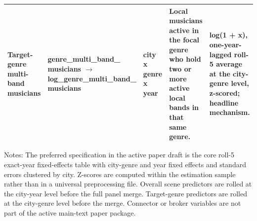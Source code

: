 \begin{table}[p]
\begin{tabularx}{\textwidth}{@{}>{\raggedright\arraybackslash}p{}>{\raggedright\arraybackslash}p{}>{\raggedright\arraybackslash}p{}YY@{}}
Target-genre multi-band musicians & genre\_multi\_band\_ \newline musicians \newline $\rightarrow$ log\_genre\_multi\_band\_ \newline musicians & city x genre x year & Local musicians active in the focal genre who hold two or more active local bands in that same genre. & log(1 + x), one-year-lagged roll-5 average at the city-genre level, z-scored; headline mechanism. \\
\bottomrule
\end{tabularx}

\vspace{0.4em}
\parbox{0.96\textwidth}{\footnotesize Notes: The preferred specification in the active paper draft
is the core roll-5 exact-year fixed-effects table with city-genre and year fixed effects
and standard errors clustered by city. Z-scores are computed within the estimation sample rather
than in a universal preprocessing file. Overall scene predictors are rolled at the city-year level
before the full panel merge. Target-genre predictors are rolled at the city-genre level before the
merge. Connector or broker variables are not part of the active main-text paper package.}
\end{table}
